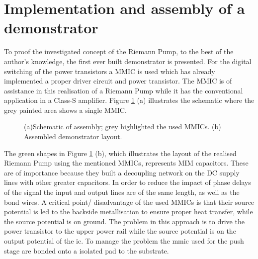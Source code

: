 \documentclass[journal]{IEEEtran}
\begin{document}
\section{Implementation and assembly of a demonstrator}
\label{sec:assembly}
To proof the investigated concept of the Riemann Pump, to the best of the author's knowledge, the first ever built demonstrator is presented.
For the digital switching of the power transistors a MMIC is used which has already implemented a proper driver circuit and power transistor.
The MMIC is of assistance in this realisation of a Riemann Pump while it has the conventional application in a Class-S amplifier.
Figure \ref{fig:assembled_demonstrator} (a) illustrates the schematic where the grey painted area shows a single MMIC.
%
\begin{figure}[htb]
  \centering
	\begin{scriptsize}
  	\def\svgwidth{\columnwidth}
 	 
  	\caption{(a)Schematic of assembly; grey highlighted the used MMICs. (b) Assembled demonstrator layout.}
  	\label{fig:assembled_demonstrator}
	\end{scriptsize}
\end{figure}
%
The green shapes in Figure \ref{fig:assembled_demonstrator} (b), which illustrates the layout of the realised Riemann Pump using the mentioned MMICs, represents MIM capacitors.
These are of importance because they built a decoupling network on the DC supply lines with other greater capacitors.
In order to reduce the impact of phase delays of the signal the input and output lines are of the same length, as well as the bond wires.
A critical point/ disadvantage of the used MMICs is that their source potential is led to the backside metallisation to ensure proper heat transfer, while the source potential is on ground.
The problem in this approach is to drive the power transistor to the upper power rail while the source potential is on the output potential of the ic.
To manage the problem the mmic used for the push stage are bonded onto a isolated pad to the substrate.
\end{document}
